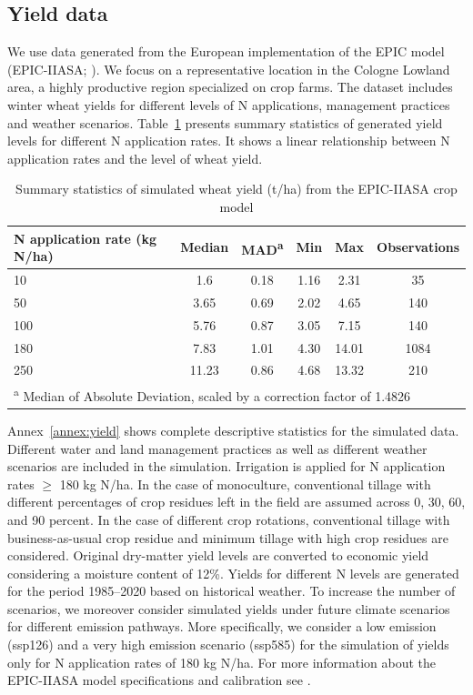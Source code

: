 \documentclass[12pt,a4paper]{article}
\begin{document}
\subsection{Yield data}

We use data generated from the European implementation of the EPIC model (EPIC-IIASA; \citealp{Balkovic2013}). We focus on a representative location in the Cologne Lowland area, a highly productive region specialized on crop farms. The dataset includes winter wheat yields for different levels of N applications, management practices and weather scenarios. Table~\ref{tab:yield_summary} presents summary statistics of generated yield levels for different N application rates. It shows a linear relationship between N application rates and the level of wheat yield.

\begin{table}[H]
\centering
\caption{Summary statistics of simulated wheat yield (t/ha) from the EPIC-IIASA crop model}
\label{tab:yield_summary}
\begin{tabular}{lccccc}
\toprule
N application rate (kg N/ha) & Median & MAD\textsuperscript{a} & Min & Max & Observations \\
\midrule
10 & 1.6 & 0.18 & 1.16 & 2.31 & 35 \\
50 & 3.65 & 0.69 & 2.02 & 4.65 & 140 \\
100 & 5.76 & 0.87 & 3.05 & 7.15 & 140 \\
180 & 7.83 & 1.01 & 4.30 & 14.01 & 1084 \\
250 & 11.23 & 0.86 & 4.68 & 13.32 & 210 \\
\bottomrule
\multicolumn{6}{l}{\footnotesize \textsuperscript{a} Median of Absolute Deviation, scaled by a correction factor of 1.4826}
\end{tabular}
\end{table}

Annex~\ref{annex:yield} shows complete descriptive statistics for the simulated data. Different water and land management practices as well as different weather scenarios are included in the simulation. Irrigation is applied for N application rates $\geq$ 180 kg N/ha. In the case of monoculture, conventional tillage with different percentages of crop residues left in the field are assumed across 0, 30, 60, and 90 percent. In the case of different crop rotations, conventional tillage with business-as-usual crop residue and minimum tillage with high crop residues are considered. Original dry-matter yield levels are converted to economic yield considering a moisture content of 12\%. Yields for different N levels are generated for the period 1985--2020 based on historical weather. To increase the number of scenarios, we moreover consider simulated yields under future climate scenarios for different emission pathways. More specifically, we consider a low emission (ssp126) and a very high emission scenario (ssp585) for the simulation of yields only for N application rates of 180 kg N/ha. For more information about the EPIC-IIASA model specifications and calibration see \citet{Balkovic2013}.
\end{document}
